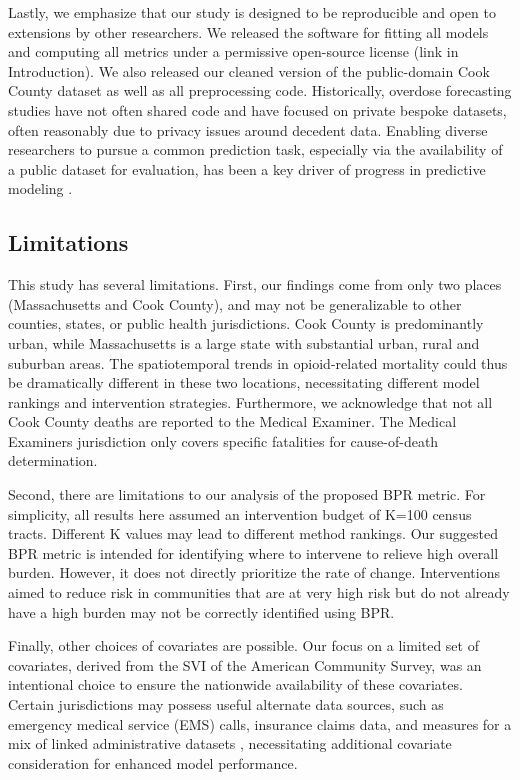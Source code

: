 Lastly, we emphasize that our study is designed to be reproducible and open to extensions by other researchers. We released the software for fitting all models and computing all metrics under a permissive open-source license (link in Introduction). We also released our cleaned version of the public-domain Cook County dataset as well as all preprocessing code. Historically, overdose forecasting studies have not often shared code and have focused on private bespoke datasets, often reasonably due to privacy issues around decedent data. Enabling diverse researchers to pursue a common prediction task, especially via the availability of a public dataset for evaluation, has been a key driver of progress in predictive modeling \citep{donoho50YearsData2017}.

\subsection{Limitations}\label{limitations}

This study has several limitations. First, our findings come from only two places (Massachusetts and Cook County), and may not be generalizable to other counties, states, or public health jurisdictions. Cook County is predominantly urban, while Massachusetts is a large state with substantial urban, rural and suburban areas. The spatiotemporal trends in opioid-related mortality could thus be dramatically different in these two locations, necessitating different model rankings and intervention strategies. Furthermore, we acknowledge that not all Cook County deaths are reported to the Medical Examiner. The Medical Examiner\textquotesingle s jurisdiction only covers specific fatalities for cause-of-death determination.

Second, there are limitations to our analysis of the proposed BPR metric. For simplicity, all results here assumed an intervention budget of K=100 census tracts. Different K values may lead to different method rankings. Our suggested BPR metric is intended for identifying where to intervene to relieve high overall burden. However, it does not directly prioritize the rate of change. Interventions aimed to reduce risk in communities that are at very high risk but do not already have a high burden may not be correctly identified using BPR.

Finally, other choices of covariates are possible. Our focus on a limited set of covariates, derived from the SVI of the American Community Survey, was an intentional choice to ensure the nationwide availability of these covariates. Certain jurisdictions may possess useful alternate data sources, such as emergency medical service (EMS) calls, insurance claims data, and measures for a mix of linked administrative datasets \citep{bharelUsingDataGuide2020}, necessitating additional covariate consideration for enhanced model performance.

